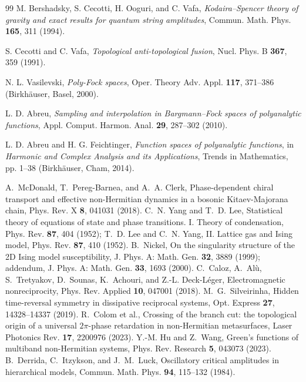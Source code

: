 \documentclass[11pt,a4paper]{article}
\begin{document}
\begin{thebibliography}{99}
M. Bershadsky, S. Cecotti, H. Ooguri, and C. Vafa,
\emph{Kodaira--Spencer theory of gravity and exact results for quantum string amplitudes},
Commun. Math. Phys. \textbf{165}, 311 (1994).

S. Cecotti and C. Vafa,
\emph{Topological anti-topological fusion},
Nucl. Phys. B \textbf{367}, 359 (1991).

N. L. Vasilevski,
\emph{Poly-Fock spaces},
Oper. Theory Adv. Appl. \textbf{117}, 371--386 (Birkh\"auser, Basel, 2000).

L. D. Abreu,
\emph{Sampling and interpolation in Bargmann--Fock spaces of polyanalytic functions},
Appl. Comput. Harmon. Anal. \textbf{29}, 287--302 (2010).

L. D. Abreu and H. G. Feichtinger,
\emph{Function spaces of polyanalytic functions},
in \emph{Harmonic and Complex Analysis and its Applications}, Trends in Mathematics,
pp. 1--38 (Birkh\"auser, Cham, 2014).

 A.~McDonald, T.~Pereg-Barnea, and A.~A. Clerk, Phase-dependent chiral transport and effective non-Hermitian dynamics in a bosonic Kitaev-Majorana chain, Phys. Rev. X \textbf{8}, 041031 (2018).
 C.~N. Yang and T.~D. Lee, Statistical theory of equations of state and phase transitions. I. Theory of condensation, Phys. Rev. \textbf{87}, 404 (1952); T.~D. Lee and C.~N. Yang, II. Lattice gas and Ising model, Phys. Rev. \textbf{87}, 410 (1952).
 B.~Nickel, On the singularity structure of the 2D Ising model susceptibility, J. Phys. A: Math. Gen. \textbf{32}, 3889 (1999); addendum, J. Phys. A: Math. Gen. \textbf{33}, 1693 (2000).
 C.~Caloz, A.~Al\`u, S.~Tretyakov, D.~Sounas, K.~Achouri,
and Z.-L. Deck-L\'eger, Electromagnetic nonreciprocity,
Phys. Rev. Applied \textbf{10}, 047001 (2018).
 M.~G.~Silveirinha, Hidden time-reversal symmetry in
dissipative reciprocal systems, Opt. Express \textbf{27}, 14328--14337 (2019).
 R.~Colom et al., Crossing of the branch cut: the topological origin of a universal $2\pi$-phase retardation in non-Hermitian metasurfaces, Laser Photonics Rev. \textbf{17}, 2200976 (2023).
 Y.-M. Hu and Z.~Wang, Green's functions of multiband non-Hermitian systems, Phys. Rev. Research \textbf{5}, 043073 (2023).
 B.~Derrida, C.~Itzykson, and J.~M.~Luck,
Oscillatory critical amplitudes in hierarchical models,
Commun. Math. Phys. \textbf{94}, 115--132 (1984).


\end{thebibliography}
\end{document}
